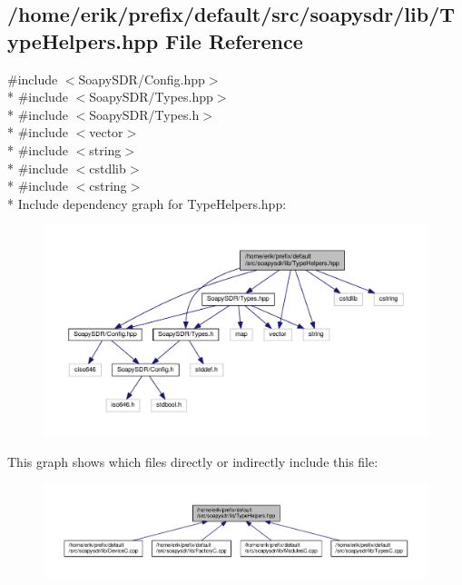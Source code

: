 \subsection{/home/erik/prefix/default/src/soapysdr/lib/\+Type\+Helpers.hpp File Reference}
\label{TypeHelpers_8hpp}
{\ttfamily \#include $<$Soapy\+S\+D\+R/\+Config.\+hpp$>$}\\*
{\ttfamily \#include $<$Soapy\+S\+D\+R/\+Types.\+hpp$>$}\\*
{\ttfamily \#include $<$Soapy\+S\+D\+R/\+Types.\+h$>$}\\*
{\ttfamily \#include $<$vector$>$}\\*
{\ttfamily \#include $<$string$>$}\\*
{\ttfamily \#include $<$cstdlib$>$}\\*
{\ttfamily \#include $<$cstring$>$}\\*
Include dependency graph for Type\+Helpers.\+hpp\+:
\nopagebreak
\begin{figure}[H]
\begin{center}
\leavevmode
\includegraphics[width=350pt]{d0/d4f/TypeHelpers_8hpp__incl}
\end{center}
\end{figure}
This graph shows which files directly or indirectly include this file\+:
\nopagebreak
\begin{figure}[H]
\begin{center}
\leavevmode
\includegraphics[width=350pt]{d1/d53/TypeHelpers_8hpp__dep__incl}
\end{center}
\end{figure}

